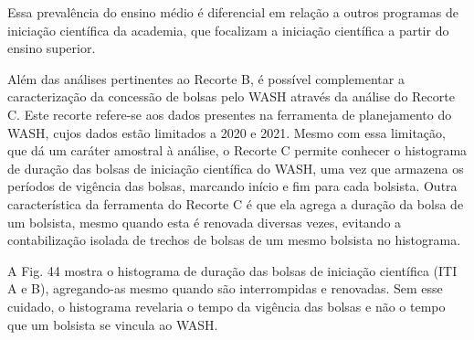 Essa prevalência do ensino médio é diferencial em relação a outros programas de iniciação científica da academia, que focalizam a iniciação científica a partir do ensino superior.

Além das análises pertinentes ao Recorte B, é possível complementar a caracterização da concessão de bolsas pelo WASH através da análise do Recorte C. Este recorte refere-se aos dados presentes na ferramenta de planejamento do WASH, cujos dados estão limitados a 2020 e 2021. Mesmo com essa limitação, que dá um caráter amostral à análise, o Recorte C permite conhecer o histograma de duração das bolsas de iniciação científica do WASH, uma vez que armazena os períodos de vigência das bolsas, marcando início e fim para cada bolsista. Outra característica da ferramenta do Recorte C é que ela agrega a duração da bolsa de um bolsista, mesmo quando esta é renovada diversas vezes, evitando a contabilização isolada de trechos de bolsas de um mesmo bolsista no histograma.

A Fig. 44 mostra o histograma de duração das bolsas de iniciação científica (ITI A e B), agregando-as mesmo quando são interrompidas e renovadas. Sem esse cuidado, o histograma revelaria o tempo da vigência das bolsas e não o tempo que um bolsista se vincula ao WASH.



